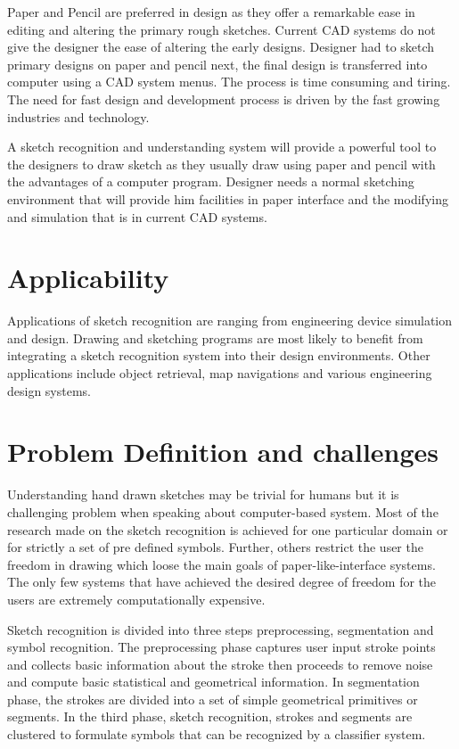  Paper and Pencil are preferred in design as they offer a remarkable ease in editing and altering the primary rough sketches. Current CAD systems do not give the designer the ease of altering the early designs. Designer had to sketch primary designs on paper and pencil next, the final design is transferred into computer using a CAD system menus. The process is time consuming and tiring. The need for fast design and development process is driven by the fast growing industries and technology.
 
 A sketch recognition and understanding system will provide a powerful tool to the designers to draw sketch as they usually draw using paper and pencil with the advantages of a computer program. Designer needs a normal sketching environment that will provide him facilities in paper interface and the modifying and simulation that is in current CAD systems. 
 
\section{Applicability }
Applications of sketch recognition are ranging from engineering device simulation and design. Drawing and sketching programs are most likely to benefit from integrating a sketch recognition system into their design environments. Other applications include object retrieval, map navigations and various engineering design systems.

\section{Problem Definition and challenges}
\label{sec:ProblemsAndChallenges}

 Understanding hand drawn sketches may be trivial for humans but it is challenging problem when speaking about computer-based system. Most of the research made on the sketch recognition is achieved for one particular domain or for strictly a set of pre defined symbols. Further, others restrict the user the freedom in drawing which loose the main goals of paper-like-interface systems. The only few systems that have achieved the desired degree of freedom for the users are extremely computationally expensive. 
 
Sketch recognition is divided into three steps preprocessing, segmentation and symbol recognition. The preprocessing phase captures user input stroke points and collects basic information about the stroke then proceeds to remove noise and compute basic statistical and geometrical information. In segmentation phase, the strokes are divided into a set of simple geometrical primitives or segments. In the third phase, sketch recognition, strokes and segments are clustered to formulate symbols that can be recognized by a classifier system. 

